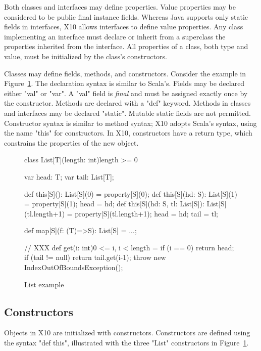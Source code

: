 \documentclass[preprint,nocopyrightspace,9pt]{sigplanconf}
\begin{document}
Both classes and interfaces may define properties. Value
properties may be considered to be public final instance fields.
Whereas
Java supports only static fields in interfaces, X10
allows interfaces to define value properties. Any class implementing
an interface must declare or inherit from a superclass 
the properties inherited from the interface.  All properties of
a class,
both type and value, must be initialized by the class's
constructors.

Classes may define fields, methods, and constructors.
Consider the example in Figure~\ref{fig:list}.
The
declaration syntax
is similar to Scala's.  Fields may be
declared either \xcd"val" or \xcd"var".  A \xcd"val" field is
\emph{final} and must be assigned exactly once by the
constructor.  Methods are
declared with a \xcd"def" keyword.
Methods in classes and interfaces may be declared \xcd"static".
Mutable static fields 
are not permitted.
Constructor syntax is
similar to method syntax; X10 adopts Scala's syntax,
using the name \xcd"this" for constructors.
In X10, constructors have a return type, which constrains
the properties of the new object.

\begin{figure}
\begin{xten}
class List[T](length: int){length >= 0} {
    var head: T;
    var tail: List[T];

    def this[S](): List[S](0) = property[S](0);
    def this[S](hd: S): List[S](1) = { property[S](1); head = hd; }
    def this[S](hd: S, tl: List[S]): List[S](tl.length+1) = {
        property[S](tl.length+1); head = hd; tail = tl;
    }

    def map[S](f: (T)=>S): List[S] = ...;

    // XXX
    def get(i: int){0 <= i, i < length} = {
        if (i == 0) return head;
        if (tail != null) return tail.get(i-1);
        throw new IndexOutOfBoundsException();
    }
}
\end{xten}
\caption{List example}
\label{fig:list}
\end{figure}

\subsection{Constructors}

Objects in X10 are initialized with constructors. 
Constructors are defined using the syntax \xcd"def this",
illustrated with the three \xcd"List"
constructors in Figure~\ref{fig:list}.
\end{document}
